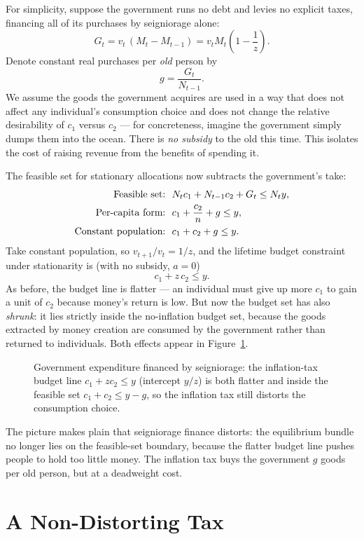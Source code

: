 For simplicity, suppose the government runs no debt and levies no explicit taxes, financing all of its purchases by seigniorage alone:
\[
G_t = v_t\,(M_t - M_{t-1}) = v_t M_t\left(1 - \frac{1}{z}\right).
\]
Denote constant real purchases per \emph{old} person by
\[
g = \frac{G_t}{N_{t-1}} .
\]
We assume the goods the government acquires are used in a way that does not affect any individual's consumption choice and does not change the relative desirability of $c_1$ versus $c_2$ --- for concreteness, imagine the government simply dumps them into the ocean. There is \emph{no subsidy} to the old this time. This isolates the cost of raising revenue from the benefits of spending it.

The feasible set for stationary allocations now subtracts the government's take:
\[
\begin{aligned}
\text{Feasible set:}\ \ & N_t c_1 + N_{t-1} c_2 + G_t \le N_t y,\\
\text{Per-capita form:}\ \ & c_1 + \frac{c_2}{n} + g \le y,\\
\text{Constant population:}\ \ & c_1 + c_2 + g \le y.
\end{aligned}
\]
Take constant population, so $v_{t+1}/v_t = 1/z$, and the lifetime budget constraint under stationarity is (with no subsidy, $a=0$)
\[
c_1 + z\,c_2 \le y .
\]
As before, the budget line is flatter --- an individual must give up more $c_1$ to gain a unit of $c_2$ because money's return is low. But now the budget set has also \emph{shrunk}: it lies strictly inside the no-inflation budget set, because the goods extracted by money creation are consumed by the government rather than returned to individuals. Both effects appear in Figure~\ref{fig:money-7}.

\begin{figure}[h]
\centering

\caption{Government expenditure financed by seigniorage: the inflation-tax budget line $c_1 + z c_2 \le y$ (intercept $y/z$) is both flatter and inside the feasible set $c_1 + c_2 \le y - g$, so the inflation tax still distorts the consumption choice.}
\label{fig:money-7}
\end{figure}

The picture makes plain that seigniorage finance distorts: the equilibrium bundle no longer lies on the feasible-set boundary, because the flatter budget line pushes people to hold too little money. The inflation tax buys the government $g$ goods per old person, but at a deadweight cost.

\section{A Non-Distorting Tax}

